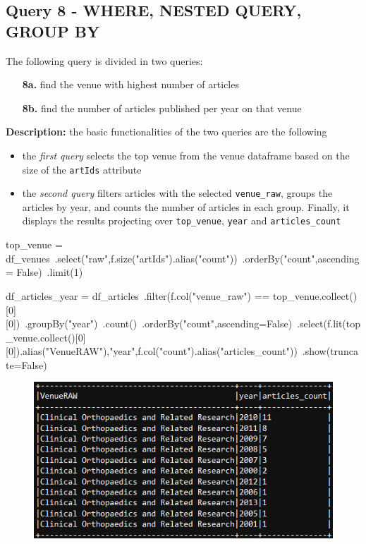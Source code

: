 \documentclass{Configuration_Files/PoliMi3i_thesis}
\begin{document}
\subsection{Query 8 - WHERE, NESTED QUERY, GROUP BY}
The following query is divided in two queries:
\begin{itemize}
    \item[\textbf{8a.}] find the venue with highest number of articles
    \item[\textbf{8b.}] find the number of articles published per year on that venue
\end{itemize}
\textbf{Description:} the basic functionalities of the two queries are the following
                    \begin{itemize}
                        \item the \emph{first query} selects the top venue from the venue dataframe based on the size of the \verb|artIds| attribute
                        \item the \emph{second query} filters articles with the selected \verb|venue_raw|, groups the articles by year, and counts the number
                            of articles in each group. Finally, it displays the results projecting over \verb|top_venue|, \verb|year| and \verb|articles_count| \\
                    \end{itemize}
\begin{python}
top_venue = df_venues\
                .select("raw",f.size("artIds").alias("count"))\
                .orderBy("count",ascending = False)\
                .limit(1)

df_articles_year = df_articles\
                        .filter(f.col("venue_raw") == top_venue.collect()[0][0])\
                        .groupBy("year")\
                        .count()\
                        .orderBy("count",ascending=False)\
                        .select(f.lit(top_venue.collect()[0][0]).alias("VenueRAW"),"year",f.col("count").alias("articles_count"))\
                        .show(truncate=False)
\end{python}
\begin{figure}[H]
\centering
\includegraphics[width=1\textwidth]{query/spark_q8.PNG}
\label{fig:query8}
\end{figure}
\end{document}

